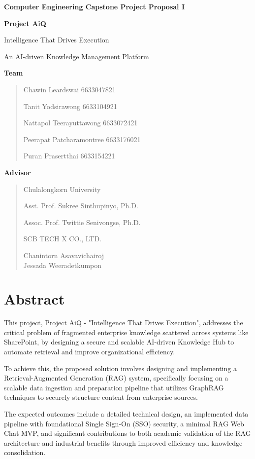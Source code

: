 \documentclass[12pt]{article}
\begin{document}
\textbf{Computer Engineering Capstone Project Proposal I}

\textbf{Project AiQ}

Intelligence That Drives Execution

An AI-driven Knowledge Management Platform

\textbf{Team}

\begin{quote}
Chawin Leardswai 6633047821

Tanit Yodsirawong 6633104921

Nattapol Teerayuttawong 6633072421

Peerapat Patcharamontree 6633176021

Puran Prasertthai 6633154221
\end{quote}

\textbf{Advisor}

\begin{quote}
Chulalongkorn University

Asst. Prof. Sukree Sinthupinyo, Ph.D.

Assoc. Prof. Twittie Senivongse, Ph.D.

SCB TECH X CO., LTD.

Chanintorn Asavavichairoj\\
Jessada Weeradetkumpon
\end{quote}

\section{\texorpdfstring{\hfill\break
}{ }}\label{section}

\section{Abstract}\label{abstract}

This project, Project AiQ - "Intelligence That Drives Execution",
addresses the critical problem of fragmented enterprise knowledge
scattered across systems like SharePoint, by designing a secure and
scalable AI-driven Knowledge Hub to automate retrieval and improve
organizational efficiency.

To achieve this, the proposed solution involves designing and
implementing a Retrieval-Augmented Generation (RAG) system, specifically
focusing on a scalable data ingestion and preparation pipeline that
utilizes GraphRAG techniques to securely structure content from
enterprise sources.

The expected outcomes include a detailed technical design, an
implemented data pipeline with foundational Single Sign-On (SSO)
security, a minimal RAG Web Chat MVP, and significant contributions to
both academic validation of the RAG architecture and industrial benefits
through improved efficiency and knowledge consolidation.
\end{document}
